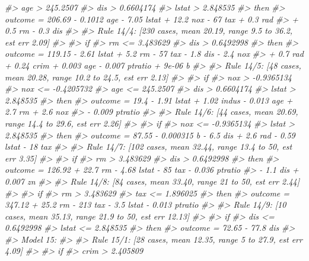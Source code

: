 \documentclass[]{book}
\newenvironment{Shaded}{\begin{snugshade}}{\end{snugshade}}
\newcommand{\CommentTok}[1]{\textcolor[rgb]{0.56,0.35,0.01}{\textit{#1}}}
\begin{document}
\begin{Shaded}
\begin{Highlighting}[]
\CommentTok{#>  age > 245.2507}
\CommentTok{#>  dis > 0.6604174}
\CommentTok{#>  lstat > 2.848535}
\CommentTok{#>     then}
\CommentTok{#>  outcome = 206.69 - 0.1012 age - 7.05 lstat + 12.2 nox - 67 tax + 0.3 rad}
\CommentTok{#>            + 0.5 rm - 0.3 dis}
\CommentTok{#> }
\CommentTok{#>   Rule 14/4: [230 cases, mean 20.19, range 9.5 to 36.2, est err 2.09]}
\CommentTok{#> }
\CommentTok{#>     if}
\CommentTok{#>  rm <= 3.483629}
\CommentTok{#>  dis > 0.6492998}
\CommentTok{#>     then}
\CommentTok{#>  outcome = 119.15 - 2.61 lstat + 5.2 rm - 57 tax - 1.8 dis - 2.4 nox}
\CommentTok{#>            + 0.7 rad + 0.24 crim + 0.003 age - 0.007 ptratio + 9e-06 b}
\CommentTok{#> }
\CommentTok{#>   Rule 14/5: [48 cases, mean 20.28, range 10.2 to 24.5, est err 2.13]}
\CommentTok{#> }
\CommentTok{#>     if}
\CommentTok{#>  nox > -0.9365134}
\CommentTok{#>  nox <= -0.4205732}
\CommentTok{#>  age <= 245.2507}
\CommentTok{#>  dis > 0.6604174}
\CommentTok{#>  lstat > 2.848535}
\CommentTok{#>     then}
\CommentTok{#>  outcome = 19.4 - 1.91 lstat + 1.02 indus - 0.013 age + 2.7 rm + 2.6 nox}
\CommentTok{#>            - 0.009 ptratio}
\CommentTok{#> }
\CommentTok{#>   Rule 14/6: [44 cases, mean 20.69, range 14.4 to 29.6, est err 2.26]}
\CommentTok{#> }
\CommentTok{#>     if}
\CommentTok{#>  nox <= -0.9365134}
\CommentTok{#>  lstat > 2.848535}
\CommentTok{#>     then}
\CommentTok{#>  outcome = 87.55 - 0.000315 b - 6.5 dis + 2.6 rad - 0.59 lstat - 18 tax}
\CommentTok{#> }
\CommentTok{#>   Rule 14/7: [102 cases, mean 32.44, range 13.4 to 50, est err 3.35]}
\CommentTok{#> }
\CommentTok{#>     if}
\CommentTok{#>  rm > 3.483629}
\CommentTok{#>  dis > 0.6492998}
\CommentTok{#>     then}
\CommentTok{#>  outcome = 126.92 + 22.7 rm - 4.68 lstat - 85 tax - 0.036 ptratio}
\CommentTok{#>            - 1.1 dis + 0.007 zn}
\CommentTok{#> }
\CommentTok{#>   Rule 14/8: [84 cases, mean 33.40, range 21 to 50, est err 2.44]}
\CommentTok{#> }
\CommentTok{#>     if}
\CommentTok{#>  rm > 3.483629}
\CommentTok{#>  tax <= 1.896025}
\CommentTok{#>     then}
\CommentTok{#>  outcome = 347.12 + 25.2 rm - 213 tax - 3.5 lstat - 0.013 ptratio}
\CommentTok{#> }
\CommentTok{#>   Rule 14/9: [10 cases, mean 35.13, range 21.9 to 50, est err 12.13]}
\CommentTok{#> }
\CommentTok{#>     if}
\CommentTok{#>  dis <= 0.6492998}
\CommentTok{#>  lstat <= 2.848535}
\CommentTok{#>     then}
\CommentTok{#>  outcome = 72.65 - 77.8 dis}
\CommentTok{#> }
\CommentTok{#> Model 15:}
\CommentTok{#> }
\CommentTok{#>   Rule 15/1: [28 cases, mean 12.35, range 5 to 27.9, est err 4.09]}
\CommentTok{#> }
\CommentTok{#>     if}
\CommentTok{#>  crim > 2.405809}

\end{Highlighting}
\end{Shaded}
\end{document}

